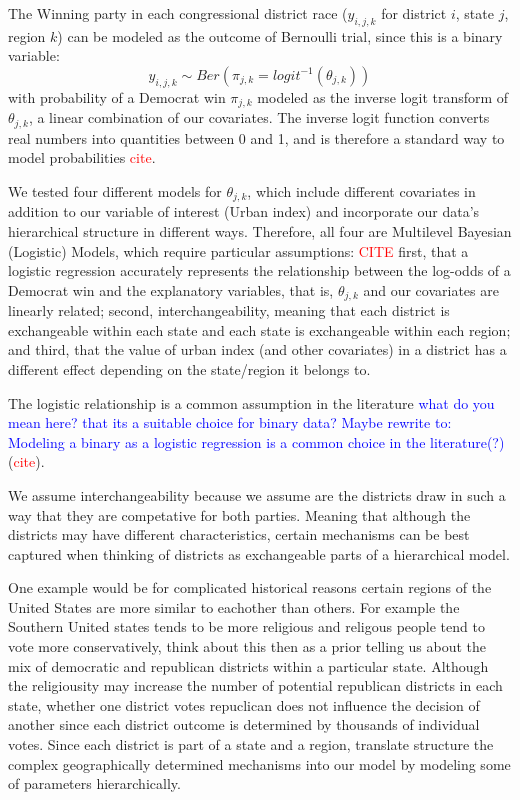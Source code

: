 \documentclass[12pt]{article}
\newcommand{\blue}[1]{\textcolor{blue}{#1}}
\begin{document}
The Winning party in each congressional district race ($y_{i,j,k}$ for district $i$, state $j$, region $k$) can be modeled as the outcome of Bernoulli trial, since this is a binary variable: 
\begin{equation}
	y_{i,j,k} \sim Ber \left( \pi_{j,k} = logit^{-1}(\theta_{j,k})  \right)
\end{equation}
with probability of a Democrat win $\pi_{j,k}$ modeled as the inverse logit transform of $\theta_{j,k}$, a linear combination of our covariates. The inverse logit function converts real numbers into quantities between 0 and 1, and is therefore a standard way to model probabilities \textcolor{red}{cite}.


We tested four different models for $\theta_{j,k}$, which include different covariates in addition to our variable of interest (Urban index) and incorporate our data's hierarchical structure in different ways. Therefore, all four are Multilevel Bayesian (Logistic) Models, which require particular assumptions: \textcolor{red}{CITE} 
first, that a logistic regression accurately represents the relationship between the log-odds of a Democrat win and the explanatory variables, that is, $\theta_{j,k}$ and our covariates are linearly related; second, interchangeability, meaning that each district is exchangeable within each state and each state is exchangeable within each region; and third, that the value of urban index (and other covariates) in a district has a different effect depending on the state/region it belongs to.


The logistic relationship is a common assumption in the literature \blue{what do you mean here? that its a suitable choice for binary data? Maybe rewrite to: Modeling a binary as a logistic regression is a common choice in the literature(?) } (\textcolor{red}{cite}).

We assume interchangeability because  we assume are the districts draw in such a way that they are competative for both parties. Meaning that although the districts may have different characteristics, certain mechanisms can be best captured when thinking of districts as exchangeable parts of  a hierarchical model. 

One example would be for complicated historical reasons certain regions of the United States are more similar to eachother than others. For example the Southern United states tends to be more religious and religous people tend to vote more conservatively, think about this then as a prior telling us about the mix of democratic and republican districts within a particular state. Although the religiousity may increase the number of potential republican districts in each state, whether one district votes repuclican does not influence the decision of another since each district outcome is determined by thousands of individual votes. 
Since each district is part of a state and a region, translate structure the complex geographically determined mechanisms into our model by modeling some of parameters hierarchically.
\end{document}
